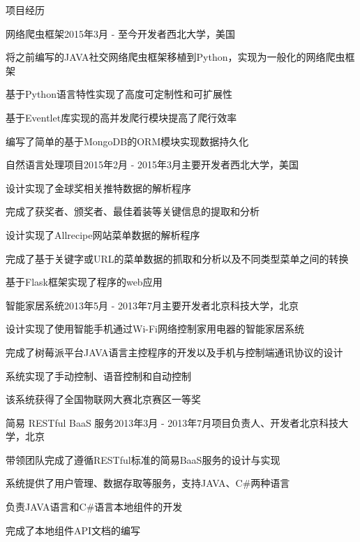 \documentclass{resume} %
\begin{document}
\begin{rSection}{项目经历}

\begin{rSubsection}{网络爬虫框架}{2015年3月 - 至今}{开发者}{西北大学，美国}
\item 将之前编写的JAVA社交网络爬虫框架移植到Python，实现为一般化的网络爬虫框架
\item 基于Python语言特性实现了高度可定制性和可扩展性
\item 基于Eventlet库实现的高并发爬行模块提高了爬行效率
\item 编写了简单的基于MongoDB的ORM模块实现数据持久化
\end{rSubsection}


\begin{rSubsection}{自然语言处理项目}{2015年2月 - 2015年3月}{主要开发者}{西北大学，美国}
\item 设计实现了金球奖相关推特数据的解析程序
\item 完成了获奖者、颁奖者、最佳着装等关键信息的提取和分析
\item 设计实现了Allrecipe网站菜单数据的解析程序
\item 完成了基于关键字或URL的菜单数据的抓取和分析以及不同类型菜单之间的转换
\item 基于Flask框架实现了程序的web应用
\end{rSubsection}


\begin{rSubsection}{智能家居系统}{2013年5月 - 2013年7月}{主要开发者}{北京科技大学，北京}
\item 设计实现了使用智能手机通过Wi-Fi网络控制家用电器的智能家居系统
\item 完成了树莓派平台JAVA语言主控程序的开发以及手机与控制端通讯协议的设计
\item 系统实现了手动控制、语音控制和自动控制
\item 该系统获得了全国物联网大赛北京赛区一等奖
\end{rSubsection}


\begin{rSubsection}{简易 RESTful BaaS 服务}{2013年3月 - 2013年7月}{项目负责人、开发者}{北京科技大学，北京}
\item 带领团队完成了遵循RESTful标准的简易BaaS服务的设计与实现
\item 系统提供了用户管理、数据存取等服务，支持JAVA、C\#两种语言
\item 负责JAVA语言和C\#语言本地组件的开发
\item 完成了本地组件API文档的编写
\end{rSubsection}

\end{rSection}
\end{document}
